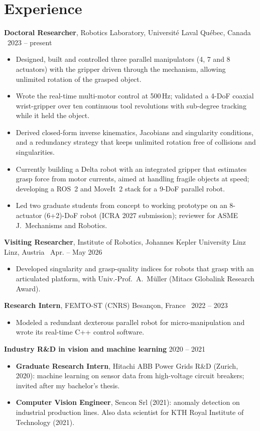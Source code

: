 \documentclass[10pt,letterpaper]{article}
\newcommand{\role}[4]{\textbf{#1}, #2 \hfill {\color{muted}#3 \textbar\ #4}\par}
\begin{document}
\section{Experience}
\role{Doctoral Researcher}{Robotics Laboratory, Universit\'e Laval}{Qu\'ebec, Canada}{2023 -- present}
\begin{itemize}
\item Designed, built and controlled three parallel manipulators (4, 7 and 8 actuators) with the gripper driven through
the mechanism, allowing unlimited rotation of the grasped object.
\item Wrote the real-time multi-motor control at 500\,Hz; validated a 4-DoF coaxial wrist-gripper over ten continuous
tool revolutions with sub-degree tracking while it held the object.
\item Derived closed-form inverse kinematics, Jacobians and singularity conditions, and a redundancy strategy that keeps
unlimited rotation free of collisions and singularities.
\item Currently building a Delta robot with an integrated gripper that estimates grasp force from motor currents, aimed
at handling fragile objects at speed; developing a ROS~2 and MoveIt~2 stack for a 9-DoF parallel robot.
\item Led two graduate students from concept to working prototype on an 8-actuator (6+2)-DoF robot (ICRA 2027
submission); reviewer for ASME J.\ Mechanisms and Robotics.
\end{itemize}

\vspace{3pt}
\role{Visiting Researcher}{Institute of Robotics, Johannes Kepler University Linz}{Linz, Austria}{Apr. -- May 2026}
\begin{itemize}
\item Developed singularity and grasp-quality indices for robots that grasp with an articulated platform, with
Univ.-Prof.~A.~M\"uller (Mitacs Globalink Research Award).
\end{itemize}

\vspace{3pt}
\role{Research Intern}{FEMTO-ST (CNRS)}{Besan\c{c}on, France}{2022 -- 2023}
\begin{itemize}
\item Modeled a redundant dexterous parallel robot for micro-manipulation and wrote its real-time C++ control software.
\end{itemize}

\vspace{3pt}
\textbf{Industry R\&D in vision and machine learning} \hfill {\color{muted}2020 -- 2021}\par
\begin{itemize}
\item \textbf{Graduate Research Intern}, Hitachi ABB Power Grids R\&D (Zurich, 2020): machine learning on sensor data from
high-voltage circuit breakers; invited after my bachelor's thesis.
\item \textbf{Computer Vision Engineer}, Sencon Srl (2021): anomaly detection on industrial production lines. Also data
scientist for KTH Royal Institute of Technology (2021).
\end{itemize}
\end{document}
